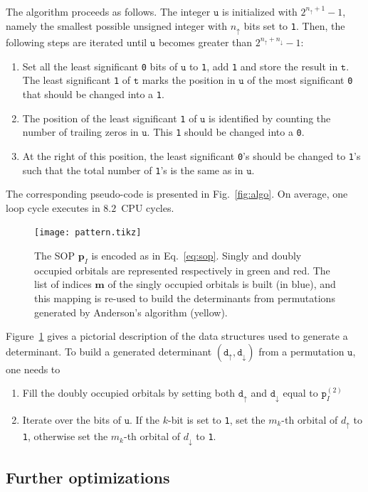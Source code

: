 \documentclass[aip,jcp,reprint,showkeys]{revtex4-1}
\newcommand{\tu}{\mathtt{u}}
\newcommand{\ttt}{\mathtt{t}}
\newcommand{\md}{\mathtt{d}}
\newcommand{\mpp}{\mathtt{p}}
\newcommand{\mpv}{\mathbf{p}}
\newcommand{\up}{\uparrow}
\newcommand{\dn}{\downarrow}
\newcommand{\one}{{\texttt{1}}}
\newcommand{\zero}{{\texttt{0}}}
\newcommand{\sop}{SOP}
\newcommand{\cpu}{CPU}
\begin{document}
The algorithm proceeds as follows. The integer $\tu$ is initialized with
$2^{n_\up+1}-1$, namely the smallest possible unsigned integer with $n_\up$
bits set to \one. 
Then, the following steps are iterated until $\tu$ becomes
greater than $2^{n_\up+n_\dn}-1$:
\begin{enumerate}
    \item Set all the least significant \zero{} bits of $\tu$ to \one{}, add \one{} and store the result in $\ttt$. The least significant \one{} of $\ttt$ marks the position in $\tu$ of the most significant \zero{} that should be changed into a \one{}.
    \item The position of the least significant \one{} of $\tu$ is identified by counting the number of trailing zeros in $\tu$. This \one{} should be changed into a \zero{}.
    \item At the right of this position, the least significant \zero's should be changed to \one's such that the total number of \one's is the same as in $\tu$.
\end{enumerate}
The corresponding pseudo-code is presented in Fig.~\ref{fig:algo}. On average, one loop cycle executes in $8.2$~\cpu{} cycles.

\begin{figure}[t]
\texttt{[image: pattern.tikz]} 
\caption{The {\sop} $\mpv_I$ is encoded as in Eq.~\eqref{eq:sop}. Singly and doubly
occupied orbitals are represented respectively in green and red.
The list of indices $\mathbf{m}$ of the singly occupied orbitals is built (in blue), and this
mapping is re-used to build the determinants from permutations generated by Anderson's algorithm (yellow).}
\label{fig:mapping}
\end{figure}

Figure~\ref{fig:mapping} gives a pictorial description of the data structures used to generate a determinant.
To build a generated determinant $(\md_\up,\md_\dn)$ from a permutation $\tu$, one needs to
\begin{enumerate}
    \item Fill the doubly occupied orbitals by setting both $\md_\up$ and $\md_\dn$
          equal to $\mpp_I^{(2)}$
    \item Iterate over the bits of $\tu$. If the $k$-bit is set to \one{}, set the $m_k$-th orbital of $d_\up$ to \one, otherwise set the $m_k$-th orbital of $d_\dn$ to \one.
\end{enumerate}

\subsection{Further optimizations}
\end{document}

